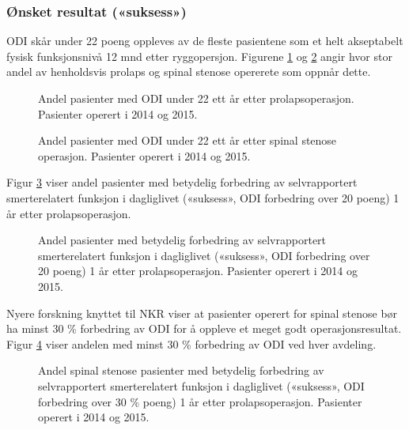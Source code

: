 \documentclass [norsk,a4paper,twoside]{article}\usepackage[]{graphicx}\usepackage[]{color}
\begin{document}
\subsubsection{Ønsket resultat («suksess»)}
ODI skår  under 22 poeng oppleves av de fleste pasientene som et helt akseptabelt fysisk funksjonsnivå 12 mnd etter ryggopersjon. Figurene \ref{fig:Osw22Pro} og \ref{fig:Osw22SS} angir hvor stor andel av henholdsvis prolaps og spinal stenose opererete som oppnår dette.

\begin{figure}[ht]
\caption{\label{fig:Osw22Pro}   Andel pasienter med ODI under 22 ett år
etter prolapsoperasjon. Pasienter operert i 2014 og 2015.}
\end{figure}

\begin{figure}[ht]
\caption{\label{fig:Osw22SS}   Andel pasienter med ODI under 22 ett år
etter spinal stenose operasjon. Pasienter operert i 2014 og 2015.}
\end{figure}



Figur \ref{fig:OswEndr20} viser andel pasienter med betydelig forbedring av selvrapportert
smerterelatert funksjon i dagliglivet («suksess», ODI forbedring over 20 poeng) 1 år
etter prolapsoperasjon.

\begin{figure}[ht]
\caption{\label{fig:OswEndr20}   Andel pasienter med betydelig forbedring av selvrapportert
smerterelatert funksjon i dagliglivet («suksess», ODI forbedring over 20 poeng) 1 år
etter prolapsoperasjon. Pasienter operert i 2014 og 2015.}
\end{figure}



Nyere forskning knyttet til NKR viser at pasienter operert for spinal stenose bør ha minst 30 \% forbedring av ODI for å oppleve et meget godt operasjonsresultat. Figur \ref{fig:OswEndr30pstSS} viser andelen med minst 30 \% forbedring av ODI ved hver avdeling.

\begin{figure}[ht]
\caption{\label{fig:OswEndr30pstSS} Andel spinal stenose pasienter med betydelig forbedring av selvrapportert
smerterelatert funksjon i dagliglivet («suksess», ODI forbedring over 30 \% poeng) 1 år
etter prolapsoperasjon. Pasienter operert i 2014 og 2015.}
\end{figure}
\end{document}
